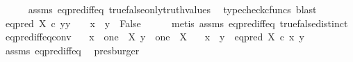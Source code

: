 \begin{isabellebody}
\ \ \ \ \isamarkupfalse%
\ assms\ eq{\isacharunderscore}{\kern0pt}pred{\isacharunderscore}{\kern0pt}iff{\isacharunderscore}{\kern0pt}eq\ true{\isacharunderscore}{\kern0pt}false{\isacharunderscore}{\kern0pt}only{\isacharunderscore}{\kern0pt}truth{\isacharunderscore}{\kern0pt}values\ \isamarkupfalse%
\ {\isacharparenleft}{\kern0pt}typecheck{\isacharunderscore}{\kern0pt}cfuncs{\isacharcomma}{\kern0pt}\ blast{\isacharparenright}{\kern0pt}\isanewline
{}\isamarkupfalse%
\isanewline
\ \ \isamarkupfalse%
\ {\isachardoublequoteopen}eq{\isacharunderscore}{\kern0pt}pred\ X\ {\isasymcirc}\isactrlsub c\ {\isasymlangle}y{\isacharcomma}{\kern0pt}y{\isasymrangle}\ {\isacharequal}{\kern0pt}\ {\isasymf}\ {\isasymLongrightarrow}\ x\ {\isacharequal}{\kern0pt}\ y\ {\isasymLongrightarrow}\ False{\isachardoublequoteclose}\isanewline
\ \ \ \ \isamarkupfalse%
\ {\isacharparenleft}{\kern0pt}metis\ assms{\isacharparenleft}{\kern0pt}{}{\isacharparenright}{\kern0pt}\ eq{\isacharunderscore}{\kern0pt}pred{\isacharunderscore}{\kern0pt}iff{\isacharunderscore}{\kern0pt}eq\ true{\isacharunderscore}{\kern0pt}false{\isacharunderscore}{\kern0pt}distinct{\isacharparenright}{\kern0pt}\isanewline
{}\isamarkupfalse%
%
\endisatagproof
{\isafoldproof}%
%
\isadelimproof
\isanewline
%
\endisadelimproof
\isanewline
{}\isamarkupfalse%
\ eq{\isacharunderscore}{\kern0pt}pred{\isacharunderscore}{\kern0pt}iff{\isacharunderscore}{\kern0pt}eq{\isacharunderscore}{\kern0pt}conv{}{\isacharcolon}{\kern0pt}\isanewline
\ \ \ {\isachardoublequoteopen}x\ {\isacharcolon}{\kern0pt}\ one\ {\isasymrightarrow}\ X{\isachardoublequoteclose}\ {\isachardoublequoteopen}y\ {\isacharcolon}{\kern0pt}\ one\ {\isasymrightarrow}\ X{\isachardoublequoteclose}\isanewline
\ \ \ {\isachardoublequoteopen}{\isacharparenleft}{\kern0pt}x\ {\isasymnoteq}\ y{\isacharparenright}{\kern0pt}\ {\isacharequal}{\kern0pt}\ {\isacharparenleft}{\kern0pt}eq{\isacharunderscore}{\kern0pt}pred\ X\ {\isasymcirc}\isactrlsub c\ {\isasymlangle}x{\isacharcomma}{\kern0pt}\ y{\isasymrangle}\ {\isasymnoteq}\ {\isasymt}{\isacharparenright}{\kern0pt}{\isachardoublequoteclose}\isanewline
%
\isadelimproof
\ \ %
\endisadelimproof
%
\isatagproof
{}\isamarkupfalse%
\ assms\ eq{\isacharunderscore}{\kern0pt}pred{\isacharunderscore}{\kern0pt}iff{\isacharunderscore}{\kern0pt}eq\ \isamarkupfalse%
\ presburger%
\endisatagproof
{\isafoldproof}%
%
\isadelimproof
\isanewline
%
\endisadelimproof

\end{isabellebody}

